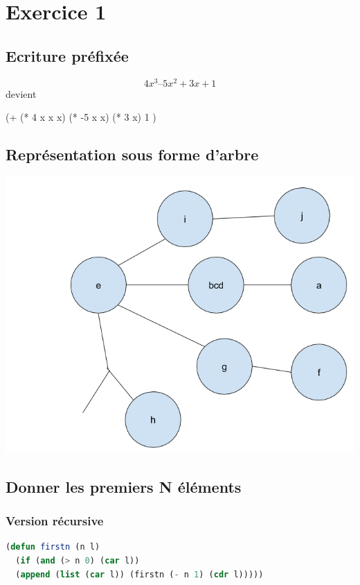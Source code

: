 \documentclass[a4paper,10pt]{report}
\begin{document}
\chapter{Exercice 1}

  \section{Ecriture préfixée}
  
  $$4x^3 – 5x^2 + 3x + 1 $$ devient \begin{center}(+ (* 4 x x x) (* -5 x x) (* 3 x) 1 )\end{center}
  
  \section{Représentation sous forme d'arbre}

  \includegraphics[scale = 0.4]{schema}
  \newpage
  \section{Donner les premiers N éléments}
  \subsection{Version récursive}
  \begin{lstlisting}[language=Lisp]
(defun firstn (n l)
  (if (and (> n 0) (car l)) 
  (append (list (car l)) (firstn (- n 1) (cdr l)))))
  \end{lstlisting}
\end{document}
